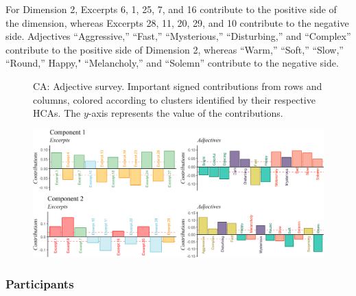 \documentclass[
  english,
  man]{apa6}
\begin{document}
For Dimension 2, Excerpts 6, 1, 25, 7, and 16 contribute to the positive side of the dimension, whereas Excerpts 28, 11, 20, 29, and 10 contribute to the negative side. Adjectives ``Aggressive,'' ``Fast,'' ``Mysterious,'' ``Disturbing,'' and ``Complex'' contribute to the positive side of Dimension 2, whereas ``Warm,'' ``Soft,'' ``Slow,'' ``Round,'' Happy," ``Melancholy,'' and ``Solemn'' contribute to the negative side.

\begin{figure}   
  \centering  
  \caption{CA: Adjective survey. Important signed contributions from rows and columns, colored according to clusters identified by their respective HCAs. The $y$-axis represents the value of the contributions.}
    \includegraphics{./Music-Descriptor-Space_files/figure-latex/contributionsAcode-1.png}
  \label{fig:contributionsA}
  \caption*{}
\end{figure}

\hypertarget{participants-3}{%
\subsubsection{Participants}\label{participants-3}}

\end{document}
